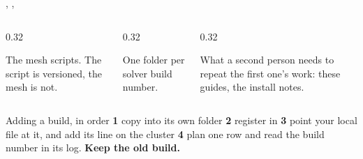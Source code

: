 \begin{frame}{, , }
\begin{columns}[T]
\begin{column}{0.32\textwidth}
\begin{block}{}
\small The mesh scripts. The script is versioned, the mesh is not.
\end{block}
\end{column}
\begin{column}{0.32\textwidth}
\begin{block}{}
\small One folder per solver build number.
\end{block}
\end{column}
\begin{column}{0.32\textwidth}
\begin{block}{}
\small What a second person needs to repeat the first one's work: these
guides, the install notes.
\end{block}
\end{column}
\end{columns}
\vspace{2mm}
\begin{block}{Adding a build, in order}
\small \textbf{1} copy into its own folder \quad \textbf{2} register in
 \quad \textbf{3} point your local file at it, and add its
\code{[builds]} line on the cluster \quad \textbf{4} plan one row and read the
build number in its log. \textbf{Keep the old build.}
\end{block}
\end{frame}
